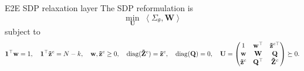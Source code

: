 \documentclass[10pt,aspectratio=169]{beamer}
\newcommand{\Nassets}{N}
\newcommand{\Kcard}{k}
\newcommand{\Param}{\theta}
\newcommand{\SigmaMat}{\Sigma}
\newcommand{\diagv}{\operatorname{diag}}
\begin{document}
\begin{frame}{E2E SDP relaxation layer}
  \footnotesize
  \setlength{\abovedisplayskip}{0.35em}
  \setlength{\belowdisplayskip}{0.35em}
  The SDP reformulation is
  \[
    \min_\mathbf{U} \; \left\langle \SigmaMat_\Param, \mathbf{W} \right\rangle
  \]
  subject to
  \[
  \begin{aligned}
    \one^\top \mathbf{w} =1,\quad \one^\top \mathbf{\tilde z}^c=\Nassets-\Kcard, \quad \mathbf{w}, \mathbf{\tilde z}^c \ge 0, \quad
    \diagv(\mathbf{\tilde Z}^c) =\mathbf{\tilde z}^c,
    \quad
    \diagv(\mathbf{Q})=0,\quad
    \mathbf{U}  =
    \begin{pmatrix}
      1 & \mathbf{w}^\top & \mathbf{\tilde z}^{c\top}\\
      \mathbf{w} & \mathbf{W} & \mathbf{Q}\\
      \mathbf{\tilde z}^c & \mathbf{Q}^\top & \mathbf{\tilde Z}^c
    \end{pmatrix}   \succeq 0.
  \end{aligned}
  \]


\end{frame}
\end{document}
